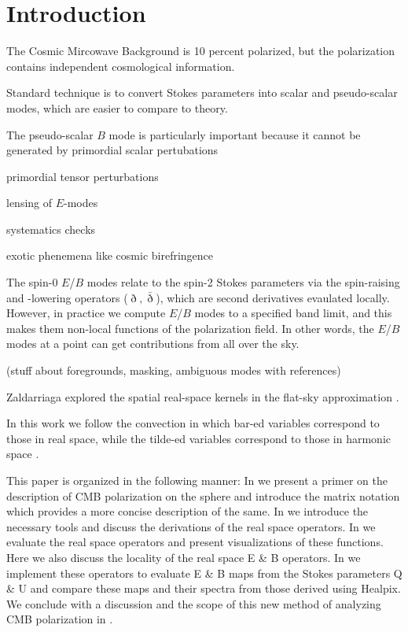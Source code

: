 \section{Introduction}
The Cosmic Mircowave Background is 10 percent polarized, but the polarization contains independent cosmological information.

Standard technique is to convert Stokes parameters into scalar and pseudo-scalar modes, which are easier to compare to theory.

The pseudo-scalar $B$ mode is particularly important because it cannot be generated by primordial scalar pertubations

primordial tensor perturbations

lensing of $E$-modes

systematics checks

exotic phenemena like cosmic birefringence

The spin-0 $E$/$B$ modes relate to the spin-2 Stokes parameters via the spin-raising and -lowering operators ($\eth,\bar \eth$), which are second derivatives evaulated locally.  However, in practice we compute $E$/$B$ modes to a specified band limit, and this makes them non-local functions of the polarization field.  In other words, the $E$/$B$ modes at a point can get contributions from all over the sky.

(stuff about foregrounds, masking, ambiguous modes with references)

Zaldarriaga explored the spatial real-space kernels in the flat-sky approximation \citep{}.


In this work we follow the convection in which bar-ed variables correspond to those in real space, while the tilde-ed variables correspond to those in harmonic space \cite{Zaldarriaga2001a}. 

This paper is organized in the following manner: In  we present a primer on the description of CMB polarization on the sphere and introduce the matrix notation which provides a more concise description of the same. In  we introduce the necessary tools  and discuss the derivations of the real space operators. In  we evaluate the real space operators and present visualizations of these functions. Here we also discuss the locality of the real space E \& B operators. In  we implement these operators to evaluate E \& B  maps from the Stokes parameters Q \& U and compare these maps and their spectra from those derived using Healpix. We conclude with a discussion and the scope of this new method of analyzing CMB polarization in .
